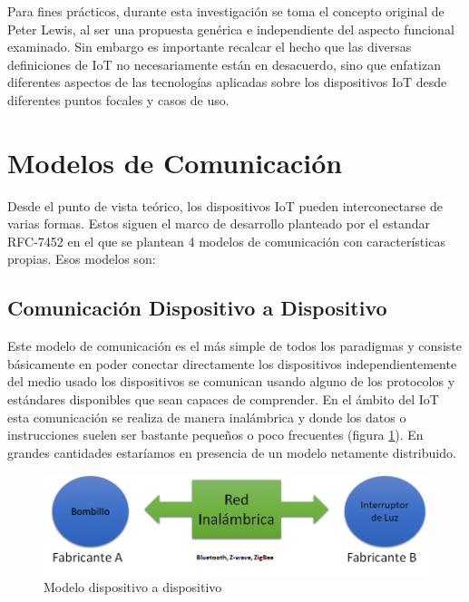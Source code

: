 Para fines prácticos, durante esta investigación se toma el concepto original de Peter Lewis, al ser una propuesta genérica e independiente del aspecto funcional examinado. Sin embargo es importante recalcar el hecho que las diversas definiciones de IoT no necesariamente están en desacuerdo, sino que enfatizan diferentes aspectos de las tecnologías aplicadas sobre los dispositivos IoT desde diferentes puntos focales y casos de uso\cite{iotInternetSociety}.

\vspace{50px}

\section{Modelos de Comunicación}
Desde el punto de vista teórico, los dispositivos IoT pueden interconectarse de varias formas. Estos siguen el marco de desarrollo planteado por el estandar RFC-7452\cite{rfc7452} en el que se plantean 4 modelos de comunicación con características propias. Esos modelos son:

\subsection{Comunicación Dispositivo a Dispositivo}
Este modelo de comunicación es el más simple de todos los paradigmas y consiste básicamente en poder conectar directamente los dispositivos independientemente del medio usado los dispositivos se comunican usando alguno de los protocolos y estándares disponibles que sean capaces de comprender. En el ámbito del IoT esta comunicación se realiza de manera inalámbrica y donde los datos o instrucciones suelen ser bastante pequeños o poco frecuentes (figura \ref{fig:d2d}). En grandes cantidades estaríamos en presencia de un modelo netamente distribuido.
\begin{figure}[htb]
\centering
\includegraphics[scale=0.425]{./Figuras/d2d.png}
\caption{Modelo dispositivo a dispositivo}
\label{fig:d2d}
\vspace*{-10pt}
\end{figure}

